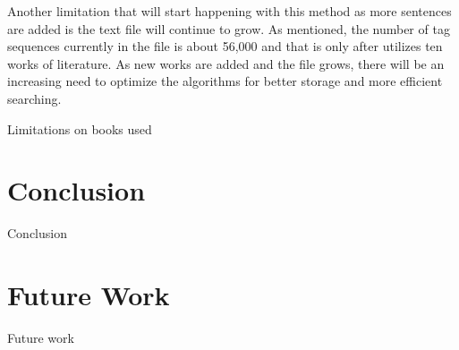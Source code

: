 \documentclass[11pt,a4paper]{article}
\begin{document}
\begin{multicols}{2}
Another limitation that will start happening with this method as more sentences are added is the text file will continue to grow. As mentioned, the number of tag sequences currently in the file is about 56,000 and that is only after utilizes ten works of literature. As new works are added and the file grows, there will be an increasing need to optimize the algorithms for better storage and more efficient searching.

Limitations on books used\\

\section{Conclusion}
Conclusion

\section{Future Work}
Future work

\newpage




\end{multicols}
\end{document}
